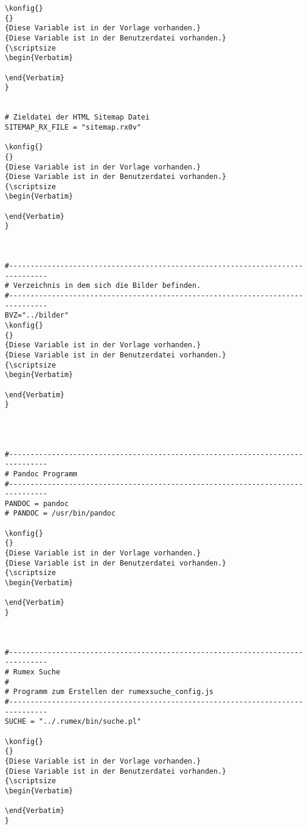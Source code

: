 \begin{verbatim}
\konfig{}
{}
{Diese Variable ist in der Vorlage vorhanden.}
{Diese Variable ist in der Benutzerdatei vorhanden.}
{\scriptsize
\begin{Verbatim}

\end{Verbatim}
}


# Zieldatei der HTML Sitemap Datei
SITEMAP_RX_FILE = "sitemap.rx0v"

\konfig{}
{}
{Diese Variable ist in der Vorlage vorhanden.}
{Diese Variable ist in der Benutzerdatei vorhanden.}
{\scriptsize
\begin{Verbatim}

\end{Verbatim}
}



#-------------------------------------------------------------------------------
# Verzeichnis in dem sich die Bilder befinden.
#-------------------------------------------------------------------------------
BVZ="../bilder"
\konfig{}
{}
{Diese Variable ist in der Vorlage vorhanden.}
{Diese Variable ist in der Benutzerdatei vorhanden.}
{\scriptsize
\begin{Verbatim}

\end{Verbatim}
}




#-------------------------------------------------------------------------------
# Pandoc Programm
#-------------------------------------------------------------------------------
PANDOC = pandoc
# PANDOC = /usr/bin/pandoc

\konfig{}
{}
{Diese Variable ist in der Vorlage vorhanden.}
{Diese Variable ist in der Benutzerdatei vorhanden.}
{\scriptsize
\begin{Verbatim}

\end{Verbatim}
}



#-------------------------------------------------------------------------------
# Rumex Suche
#
# Programm zum Erstellen der rumexsuche_config.js
#-------------------------------------------------------------------------------
SUCHE = "../.rumex/bin/suche.pl"

\konfig{}
{}
{Diese Variable ist in der Vorlage vorhanden.}
{Diese Variable ist in der Benutzerdatei vorhanden.}
{\scriptsize
\begin{Verbatim}

\end{Verbatim}
}



\end{verbatim}
